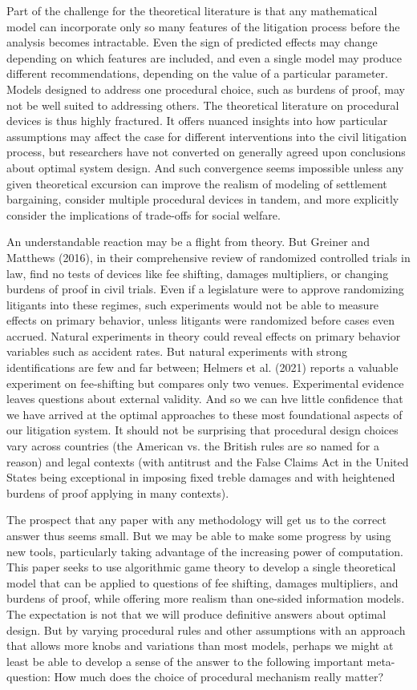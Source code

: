 \documentclass{article}
\begin{document}
Part of the challenge for the theoretical literature is that any mathematical model can incorporate only so many features of the litigation process before the analysis becomes intractable. Even the sign of predicted effects may change depending on which features are included, and even a single model may produce different recommendations, depending on the value of a particular parameter. Models designed to address one procedural choice, such as burdens of proof, may not be well suited to addressing others. The theoretical literature on procedural devices is thus highly fractured. It offers nuanced insights into how particular assumptions may affect the case for different interventions into the civil litigation process, but researchers have not converted on generally agreed upon conclusions about optimal system design. And such convergence seems impossible unless any given theoretical excursion can improve the realism of modeling of settlement bargaining, consider multiple procedural devices in tandem, and more explicitly consider the implications of trade-offs for social welfare.

An understandable reaction may be a flight from theory. But Greiner and Matthews (2016), in their comprehensive review of randomized controlled trials in law, find no tests of devices like fee shifting, damages multipliers, or changing burdens of proof in civil trials. Even if a legislature were to approve randomizing litigants into these regimes, such experiments would not be able to measure effects on primary behavior, unless litigants were randomized before cases even accrued. Natural experiments in theory could reveal effects on primary behavior variables such as accident rates. But natural experiments with strong identifications are few and far between; Helmers et al. (2021) reports a valuable experiment on fee-shifting but compares only two venues. Experimental evidence leaves questions about external validity. And so we can hve little confidence that we have arrived at the optimal approaches to these most foundational aspects of our litigation system. It should not be surprising that procedural design choices vary across countries (the American vs. the British rules are so named for a reason) and legal contexts (with antitrust and the False Claims Act in the United States being exceptional in imposing fixed treble damages and with heightened burdens of proof applying in many contexts).

The prospect that any paper with any methodology will get us to the correct answer thus seems small. But we may be able to make some progress by using new tools, particularly taking advantage of the increasing power of computation. This paper seeks to use algorithmic game theory to develop a single theoretical model that can be applied to questions of fee shifting, damages multipliers, and burdens of proof, while offering more realism than one-sided information models. The expectation is not that we will produce definitive answers about optimal design. But by varying procedural rules and other assumptions with an approach that allows more knobs and variations than most models, perhaps we might at least be able to develop a sense of the answer to the following important meta-question: How much does the choice of procedural mechanism really matter? 
\end{document}
